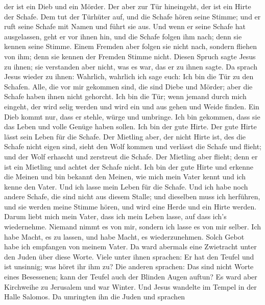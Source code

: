der ist ein Dieb und ein Mörder.  Der aber zur Tür
hineingeht, der ist ein Hirte der Schafe.  Dem tut der
Türhüter auf, und die Schafe hören seine Stimme; und er ruft seine
Schafe mit Namen und führt sie aus.  Und wenn er seine
Schafe hat ausgelassen, geht er vor ihnen hin, und die Schafe folgen ihm
nach; denn sie kennen seine Stimme.  Einem Fremden aber
folgen sie nicht nach, sondern fliehen von ihm; denn sie kennen der
Fremden Stimme nicht.  Diesen Spruch sagte Jesus zu ihnen;
sie verstanden aber nicht, was es war, das er zu ihnen sagte.
 Da sprach Jesus wieder zu ihnen: Wahrlich, wahrlich ich
sage euch: Ich bin die Tür zu den Schafen.  Alle, die vor
mir gekommen sind, die sind Diebe und Mörder; aber die Schafe haben
ihnen nicht gehorcht.  Ich bin die Tür; wenn jemand durch
mich eingeht, der wird selig werden und wird ein und aus gehen und Weide
finden.  Ein Dieb kommt nur, dass er stehle, würge und
umbringe. Ich bin gekommen, dass sie das Leben und volle Genüge haben
sollen.  Ich bin der gute Hirte. Der gute Hirte lässt sein
Leben für die Schafe.  Der Mietling aber, der nicht Hirte
ist, des die Schafe nicht eigen sind, sieht den Wolf kommen und verlässt
die Schafe und flieht; und der Wolf erhascht und zerstreut die Schafe.
 Der Mietling aber flieht; denn er ist ein Mietling und
achtet der Schafe nicht.  Ich bin der gute Hirte und
erkenne die Meinen und bin bekannt den Meinen,  wie mich
mein Vater kennt und ich kenne den Vater. Und ich lasse mein Leben für
die Schafe.  Und ich habe noch andere Schafe, die sind
nicht aus diesem Stalle; und dieselben muss ich herführen, und sie
werden meine Stimme hören, und wird eine Herde und ein Hirte werden.
 Darum liebt mich mein Vater, dass ich mein Leben lasse,
auf dass ich's wiedernehme.  Niemand nimmt es von mir,
sondern ich lasse es von mir selber. Ich habe Macht, es zu lassen, und
habe Macht, es wiederzunehmen. Solch Gebot habe ich empfangen von meinem
Vater.  Da ward abermals eine Zwietracht unter den Juden
über diese Worte.  Viele unter ihnen sprachen: Er hat den
Teufel und ist unsinnig; was höret ihr ihm zu?  Die anderen
sprachen: Das sind nicht Worte eines Besessenen; kann der Teufel auch
der Blinden Augen auftun?  Es ward aber Kirchweihe zu
Jerusalem und war Winter.  Und Jesus wandelte im Tempel in
der Halle Salomos.  Da umringten ihn die Juden und sprachen
